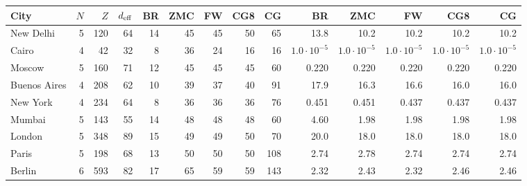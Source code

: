 \begin{tabular}{lrrr|rrrrr|rrrrr}
\toprule
City & $N$ & $Z$ & $d_{\rm eff}$ & BR & ZMC & FW & CG8 & CG & BR & ZMC & FW & CG8 & CG \\
\midrule
New Delhi & 5 & 120 & 64 & 14 & 45 & 45 & 50 & 65 & 13.8 & 10.2 & 10.2 & 10.2 & 10.2 \\
Cairo & 4 & 42 & 32 & 8 & 36 & 24 & 16 & 16 & $1.0\cdot10^{-5}$ & $1.0\cdot10^{-5}$ & $1.0\cdot10^{-5}$ & $1.0\cdot10^{-5}$ & $1.0\cdot10^{-5}$ \\
Moscow & 5 & 160 & 71 & 12 & 45 & 45 & 45 & 60 & 0.220 & 0.220 & 0.220 & 0.220 & 0.220 \\
Buenos Aires & 4 & 208 & 62 & 10 & 39 & 37 & 40 & 91 & 17.9 & 16.3 & 16.6 & 16.0 & 16.0 \\
New York & 4 & 234 & 64 & 8 & 36 & 36 & 36 & 76 & 0.451 & 0.451 & 0.437 & 0.437 & 0.437 \\
Mumbai & 5 & 143 & 55 & 14 & 48 & 48 & 48 & 60 & 4.60 & 1.98 & 1.98 & 1.98 & 1.98 \\
London & 5 & 348 & 89 & 15 & 49 & 49 & 50 & 70 & 20.0 & 18.0 & 18.0 & 18.0 & 18.0 \\
Paris & 5 & 198 & 68 & 13 & 50 & 50 & 50 & 108 & 2.74 & 2.78 & 2.74 & 2.74 & 2.74 \\
Berlin & 6 & 593 & 82 & 17 & 65 & 59 & 59 & 143 & 2.32 & 2.43 & 2.32 & 2.46 & 2.46 \\
\bottomrule
\end{tabular}
